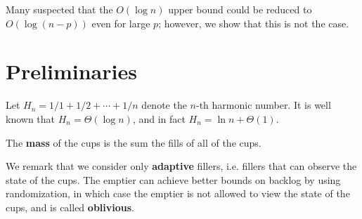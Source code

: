 \documentclass[11pt]{article}
\begin{document}
Many suspected that the $O(\log n)$ upper bound could be reduced
to $O(\log(n-p))$ even for large $p$; however, we show that this
is not the case.  

\section{Preliminaries}
Let $H_n = 1/1+1/2+\cdots +1/n$ denote the $n$-th harmonic
number. It is well known that $H_n = \Theta(\log n)$, and in fact
$H_n = \ln n + \Theta(1)$.

The \textbf{mass} of the cups is the sum the fills of all of the cups.

We remark that we consider only \textbf{adaptive} fillers, i.e. fillers
that can observe the state of the cups. The emptier can achieve
better bounds on backlog by using randomization, in which case
the emptier is not allowed to view the state of the cups, and is
called \textbf{oblivious}.
\end{document}
